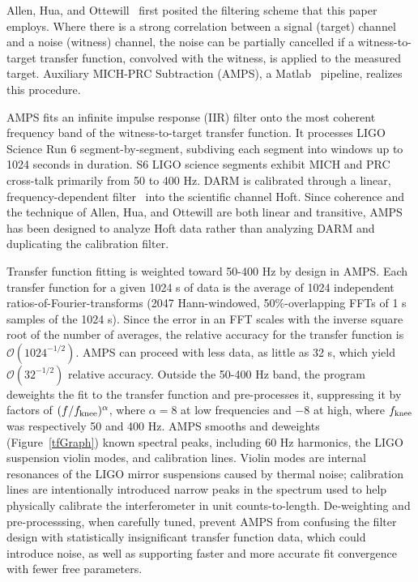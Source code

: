 	Allen, Hua, and Ottewill~\cite{AllenHuaOttewill1999} first posited the filtering scheme that this paper employs. Where there is a strong correlation between a signal (target) channel and a noise (witness) channel, the noise can be partially cancelled if a witness-to-target transfer function, convolved with the witness, is applied to the measured target. Auxiliary MICH-PRC Subtraction (AMPS), a Matlab~\cite{Matlab2012a} pipeline, realizes this procedure.

AMPS fits an infinite impulse response (IIR) filter onto the most coherent frequency band of the witness-to-target transfer function. It processes LIGO Science Run 6 segment-by-segment, subdiving each segment into windows up to 1024 seconds in duration. S6 LIGO science segments exhibit MICH and PRC cross-talk primarily from 50 to 400 Hz. DARM is calibrated through a linear, frequency-dependent filter~\cite{LIGOCal2010} into the scientific channel Hoft. Since coherence and the technique of Allen, Hua, and Ottewill are both linear and transitive, AMPS has been designed to analyze Hoft data rather than analyzing DARM and duplicating the calibration filter.

Transfer function fitting is weighted toward 50-400 Hz by design in AMPS. Each transfer function for a given 1024 s of data is the average of 1024 independent ratios-of-Fourier-transforms (2047 Hann-windowed, 50\%-overlapping FFTs of 1 s samples of the 1024 s). Since the error in an FFT scales with the inverse square root of the number of averages, the relative accuracy for the transfer function is $\mathcal{O}\left(1024^{-1/2}\right)$. AMPS can proceed with less data, as little as 32 s, which yield $\mathcal{O}\left(32^{-1/2}\right)$ relative accuracy. Outside the 50-400 Hz band, the program deweights the fit to the transfer function and pre-processes it, suppressing it by factors of $(f/f_\textup{knee})^\alpha$, where $\alpha = 8$ at low frequencies and $-8$ at high, where $f_\textup{knee}$ was respectively 50 and 400 Hz. AMPS smooths and deweights (Figure~\ref{tfGraph}) known spectral peaks, including 60 Hz harmonics, the LIGO suspension violin modes, and calibration lines. Violin modes are internal resonances of the LIGO mirror suspensions caused by thermal noise; calibration lines are intentionally introduced narrow peaks in the spectrum used to help physically calibrate the interferometer in unit counts-to-length. De-weighting and pre-processsing, when carefully tuned, prevent AMPS from confusing the filter design with statistically insignificant transfer function data, which could introduce noise, as well as supporting faster and more accurate fit convergence with fewer free parameters.

